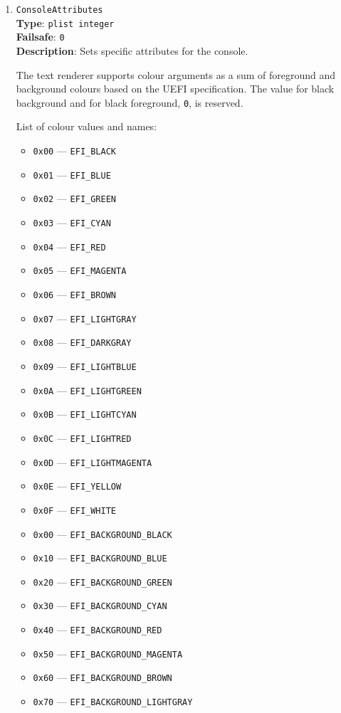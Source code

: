 \documentclass[]{article}
\providecommand{\tightlist}{%
  \setlength{\itemsep}{0pt}\setlength{\parskip}{0pt}}
\begin{document}
\begin{enumerate}

\item
  \texttt{ConsoleAttributes}\\
  \textbf{Type}: \texttt{plist\ integer}\\
  \textbf{Failsafe}: \texttt{0}\\
  \textbf{Description}: Sets specific attributes for the console.

  The text renderer supports colour arguments as a sum of foreground and background
  colours based on the UEFI specification. The value for black background and for
  black foreground, \texttt{0}, is reserved.

  List of colour values and names:

  \begin{itemize}
  \tightlist
  \item \texttt{0x00} --- \texttt{EFI\_BLACK}
  \item \texttt{0x01} --- \texttt{EFI\_BLUE}
  \item \texttt{0x02} --- \texttt{EFI\_GREEN}
  \item \texttt{0x03} --- \texttt{EFI\_CYAN}
  \item \texttt{0x04} --- \texttt{EFI\_RED}
  \item \texttt{0x05} --- \texttt{EFI\_MAGENTA}
  \item \texttt{0x06} --- \texttt{EFI\_BROWN}
  \item \texttt{0x07} --- \texttt{EFI\_LIGHTGRAY}
  \item \texttt{0x08} --- \texttt{EFI\_DARKGRAY}
  \item \texttt{0x09} --- \texttt{EFI\_LIGHTBLUE}
  \item \texttt{0x0A} --- \texttt{EFI\_LIGHTGREEN}
  \item \texttt{0x0B} --- \texttt{EFI\_LIGHTCYAN}
  \item \texttt{0x0C} --- \texttt{EFI\_LIGHTRED}
  \item \texttt{0x0D} --- \texttt{EFI\_LIGHTMAGENTA}
  \item \texttt{0x0E} --- \texttt{EFI\_YELLOW}
  \item \texttt{0x0F} --- \texttt{EFI\_WHITE}
  \item \texttt{0x00} --- \texttt{EFI\_BACKGROUND\_BLACK}
  \item \texttt{0x10} --- \texttt{EFI\_BACKGROUND\_BLUE}
  \item \texttt{0x20} --- \texttt{EFI\_BACKGROUND\_GREEN}
  \item \texttt{0x30} --- \texttt{EFI\_BACKGROUND\_CYAN}
  \item \texttt{0x40} --- \texttt{EFI\_BACKGROUND\_RED}
  \item \texttt{0x50} --- \texttt{EFI\_BACKGROUND\_MAGENTA}
  \item \texttt{0x60} --- \texttt{EFI\_BACKGROUND\_BROWN}
  \item \texttt{0x70} --- \texttt{EFI\_BACKGROUND\_LIGHTGRAY}
  \end{itemize}


\end{enumerate}
\end{document}
